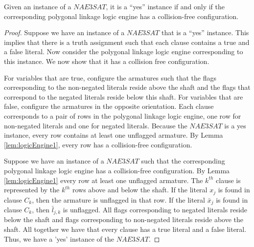 \begin{thm}\label{thm:chp2-HingedPolygons-1}
 Given an instance of a $NAE3SAT$,  it is a ``yes'' instance if and only if the 
corresponding polygonal linkage logic engine has a collision-free configuration.  
\end{thm}
\begin{proof}
Suppose we have an instance of a $NAE3SAT$ that is a ``yes'' instance. This implies that there is a 
truth assignment such that each clause contains a true and a false literal. Now consider the polygonal linkage logic 
engine corresponding to this instance. We now 
show that it has a collision free configuration.

For variables that are true, configure the armatures such that the flags corresponding to the 
non-negated literals reside above the 
shaft and the flags that correspond to the negated literals reside below this shaft.  For variables 
that are false, configure the 
armatures in the opposite orientation.  Each clause corresponds to a pair of rows in 
the polygonal linkage logic engine, one row for non-negated literals and one for negated literals.  Because the 
$NAE3SAT$ is a yes instance, every row contains at least one unflagged armature.  
By Lemma \ref{lem:logicEngine1}, every row  has a collision-free configuration.

Suppose we have an instance of a $NAE3SAT$ such that the corresponding polygonal linkage logic engine has a 
collision-free configuration. By Lemma \ref{lem:logicEngine1} every row at least one unflagged 
armature.  The $k^{th}$ clause is represented by the $k^{th}$ rows above and below the shaft. If the 
literal $x_j$ is found in clause $C_k$, then the armature is unflagged in that row. If the literal 
$\bar{x}_j$ is found in clause $C_k$, then $\bar{l}_{j,k}$ is unflagged.  All flags 
corresponding to negated literals reside below the shaft and flags corresponding to non-negated 
literals reside above the shaft.  All together we have that every clause has a true literal and a 
false literal.  Thus, we have a 'yes' instance of the $NAE3SAT$.
\end{proof}